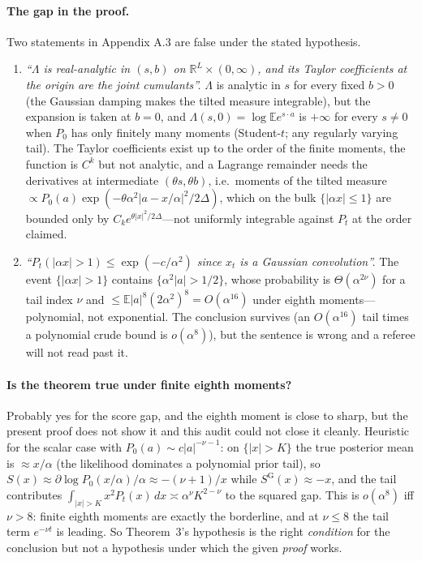\documentclass[11pt,a4paper]{article}
\newcommand{\E}{\mathbb{E}}
\newcommand{\R}{\mathbb{R}}
\newcommand{\Sg}{S^{\mathrm{G}}}
\theoremstyle{definition}
\theoremstyle{remark}
\begin{document}
\paragraph{The gap in the proof.} Two statements in Appendix A.3 are false under the stated hypothesis.
\begin{enumerate}
\item \emph{``$\Lambda$ is real-analytic in $(s,b)$ on $\R^L\times(0,\infty)$, and its Taylor coefficients at the origin are the joint cumulants''.} $\Lambda$ is analytic in $s$ for every fixed $b>0$ (the Gaussian damping makes the tilted measure integrable), but the expansion is taken at $b=0$, and $\Lambda(s,0)=\log\E e^{s\cdot a}$ is $+\infty$ for every $s\ne0$ when $P_0$ has only finitely many moments (Student-$t$; any regularly varying tail). The Taylor coefficients exist up to the order of the finite moments, the function is $C^k$ but not analytic, and a Lagrange remainder needs the derivatives at intermediate $(\theta s,\theta b)$, i.e.\ moments of the tilted measure $\propto P_0(a)\exp(-\theta\alpha^2|a-x/\alpha|^2/2\Delta)$, which on the bulk $\{|\alpha x|\le1\}$ are bounded only by $C_k e^{\theta|x|^2/2\Delta}$---not uniformly integrable against $P_t$ at the order claimed.
\item \emph{``$P_t(|\alpha x|>1)\le\exp(-c/\alpha^2)$ since $x_t$ is a Gaussian convolution''.} The event $\{|\alpha x|>1\}$ contains $\{\alpha^2|a|>1/2\}$, whose probability is $\Theta(\alpha^{2\nu})$ for a tail index $\nu$ and $\le\E|a|^8(2\alpha^2)^8=O(\alpha^{16})$ under eighth moments---polynomial, not exponential. The conclusion survives (an $O(\alpha^{16})$ tail times a polynomial crude bound is $o(\alpha^8)$), but the sentence is wrong and a referee will not read past it.
\end{enumerate}

\paragraph{Is the theorem true under finite eighth moments?} Probably yes for the score gap, and the eighth moment is close to sharp, but the present proof does not show it and this audit could not close it cleanly. Heuristic for the scalar case with $P_0(a)\sim c|a|^{-\nu-1}$: on $\{|x|>K\}$ the true posterior mean is $\approx x/\alpha$ (the likelihood dominates a polynomial prior tail), so $S(x)\approx\partial\log P_0(x/\alpha)/\alpha\approx-(\nu+1)/x$ while $\Sg(x)\approx-x$, and the tail contributes $\int_{|x|>K}x^2P_t(x)\,dx\asymp\alpha^\nu K^{2-\nu}$ to the squared gap. This is $o(\alpha^8)$ iff $\nu>8$: finite eighth moments are exactly the borderline, and at $\nu\le8$ the tail term $e^{-\nu t}$ is leading. So Theorem~3's hypothesis is the right \emph{condition} for the conclusion but not a hypothesis under which the given \emph{proof} works.
\end{document}

